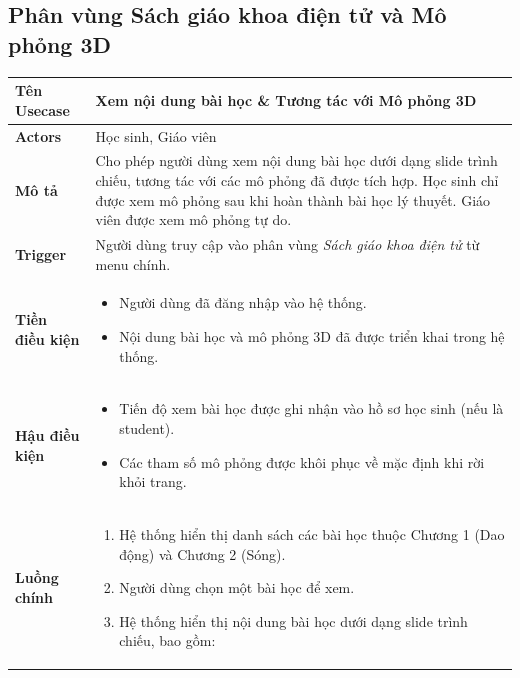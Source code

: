 \clearpage

\subsection{Phân vùng Sách giáo khoa điện tử và Mô phỏng 3D}

\begin{longtable}{|p{}|p{}|}
\hline
\textbf{Tên Usecase} & \textbf{Xem nội dung bài học \& Tương tác với Mô phỏng 3D} \\
\hline
\textbf{Actors} & Học sinh, Giáo viên \\
\hline
\textbf{Mô tả} & 
Cho phép người dùng xem nội dung bài học dưới dạng slide trình chiếu, tương tác với các mô phỏng đã được tích hợp. Học sinh chỉ được xem mô phỏng sau khi hoàn thành bài học lý thuyết. Giáo viên được xem mô phỏng tự do. \\
\hline
\textbf{Trigger} & 
Người dùng truy cập vào phân vùng \textit{Sách giáo khoa điện tử} từ menu chính. \\
\hline
\textbf{Tiền điều kiện} & 
\vspace{-\baselineskip}
\begin{itemize}[topsep=2pt, itemsep=0pt]
    \item Người dùng đã đăng nhập vào hệ thống.
    \item Nội dung bài học và mô phỏng 3D đã được triển khai trong hệ thống.
\end{itemize} \\
\hline
\textbf{Hậu điều kiện} & 
\vspace{-\baselineskip}
\begin{itemize}[topsep=2pt, itemsep=0pt]
    \item Tiến độ xem bài học được ghi nhận vào hồ sơ học sinh (nếu là student).
    \item Các tham số mô phỏng được khôi phục về mặc định khi rời khỏi trang.
\end{itemize} \\
\hline
\textbf{Luồng chính} &
\vspace{-\baselineskip}
\begin{enumerate}[topsep=2pt, itemsep=0pt]
    \item Hệ thống hiển thị danh sách các bài học thuộc Chương 1 (Dao động) và Chương 2 (Sóng).
    \item Người dùng chọn một bài học để xem.
    \item Hệ thống hiển thị nội dung bài học dưới dạng slide trình chiếu, bao gồm:
    \begin{itemize}[topsep=0pt, itemsep=0pt]

\end{itemize}
\end{enumerate}
\end{longtable}
